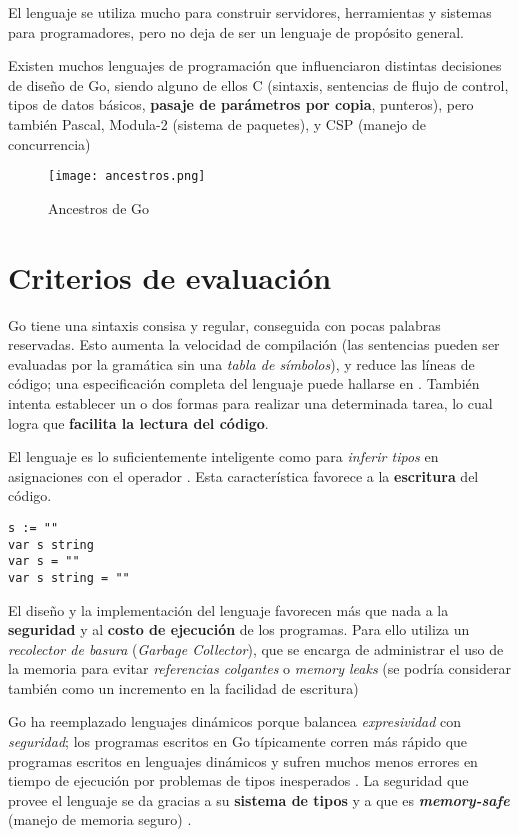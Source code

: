 El lenguaje se utiliza mucho para construir servidores, herramientas y sistemas para programadores, pero no deja de ser un lenguaje de propósito general.

Existen muchos lenguajes de programación que influenciaron distintas decisiones de diseño de Go, siendo alguno de ellos C (sintaxis, sentencias de flujo de control, tipos de datos básicos, \textbf{pasaje de parámetros por copia}, punteros), pero también Pascal, Modula-2 (sistema de paquetes), y CSP (manejo de concurrencia)

\begin{figure}[H]
    \centering
    \texttt{[image: ancestros.png]}
    \caption{Ancestros de Go \autocite{BookTheGoProgrammingLanguage:Preface}}
    \label{fig:name}
\end{figure}


\section{Criterios de evaluación}

Go tiene una sintaxis consisa y regular, conseguida con pocas palabras reservadas. Esto aumenta la velocidad de compilación (las sentencias pueden ser evaluadas por la gramática sin una \emph{tabla de símbolos}), y reduce las líneas de código; una especificación completa del lenguaje puede hallarse en \autocite{GolangSpec}. También intenta establecer un o dos formas para realizar una determinada tarea, lo cual logra que \textbf{facilita la lectura del código}.

El lenguaje es lo suficientemente inteligente como para \emph{inferir tipos} en asignaciones con el operador \dq{:=}. Esta característica favorece a la \textbf{escritura} del código.  

\begin{lstlisting}[title=Distintas formas de declarar una variable]
s := ""
var s string
var s = ""
var s string = ""
\end{lstlisting}

El diseño y la implementación del lenguaje favorecen más que nada a la \textbf{seguridad} y al \textbf{costo de ejecución} de los programas. Para ello utiliza un \emph{recolector de basura} (\emph{Garbage Collector}), que se encarga de administrar el uso de la memoria para evitar \emph{referencias colgantes} o \emph{memory leaks} (se podría considerar también como un incremento en la facilidad de escritura)   

Go ha reemplazado lenguajes dinámicos porque balancea \emph{expresividad} con \emph{seguridad}; los programas escritos en Go típicamente corren más rápido que programas escritos en lenguajes dinámicos y sufren muchos menos errores en tiempo de ejecución por problemas de tipos inesperados \autocite{BookTheGoProgrammingLanguage:Preface}. La seguridad que provee el lenguaje se da gracias a su \textbf{sistema de tipos} y a que es \textbf{\emph{memory-safe}} (manejo de memoria seguro) \autocite{TheGoProgrammingLanguage}. 

